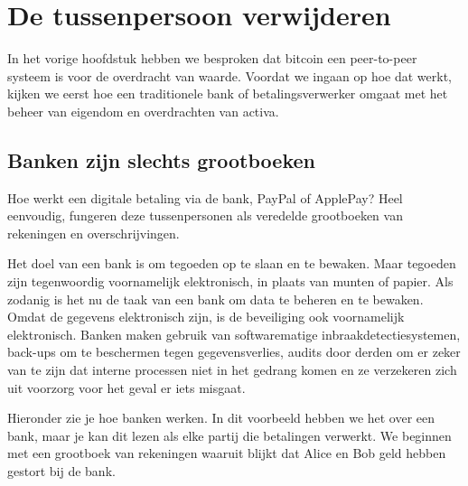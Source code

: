 \documentclass[smalldemyvopaper,11pt,twoside,onecolumn,openright,extrafontsizes]{memoir}
\begin{document}
\setcounter{footnote}{0}

\clearpage

\frontmatter

\normalfont

\cleardoublepage
\setcounter{tocdepth}{0}
\tableofcontents*
\clearpage




\mainmatter
\pagestyle{plain}

 

\hypertarget{chap2}{%
\chapter{De tussenpersoon verwijderen}\label{chap2}}

In het vorige hoofdstuk hebben we besproken dat bitcoin een peer-to-peer systeem is voor de overdracht van waarde. Voordat we ingaan op hoe dat werkt, kijken we eerst hoe een traditionele bank of betalingsverwerker omgaat met het beheer van eigendom en overdrachten van activa.

\section{Banken zijn slechts grootboeken}

Hoe werkt een digitale betaling via de bank, PayPal of ApplePay? Heel eenvoudig, fungeren deze tussenpersonen als veredelde grootboeken van rekeningen en overschrijvingen.

Het doel van een bank is om tegoeden op te slaan en te bewaken. Maar tegoeden zijn tegenwoordig voornamelijk elektronisch, in plaats van munten of papier. Als zodanig is het nu de taak van een bank om data te beheren en te bewaken. Omdat de gegevens elektronisch zijn, is de beveiliging ook voornamelijk elektronisch. Banken maken gebruik van softwarematige inbraakdetectiesystemen, back-ups om te beschermen tegen gegevensverlies, audits door derden om er zeker van te zijn dat interne processen niet in het gedrang komen en ze verzekeren zich uit voorzorg voor het geval er iets misgaat.

Hieronder zie je hoe banken werken. In dit voorbeeld hebben we het over een bank, maar je kan dit lezen als elke partij die betalingen verwerkt. We beginnen met een grootboek van rekeningen waaruit blijkt dat Alice en Bob geld hebben gestort bij de bank.
\end{document}
